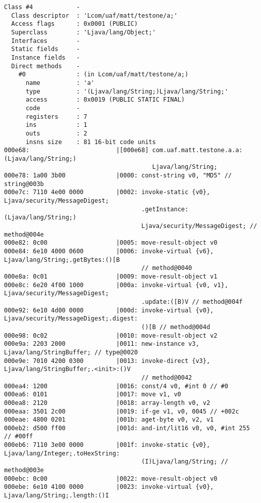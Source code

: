 \begin{lstlisting}
Class #4            -
  Class descriptor  : 'Lcom/uaf/matt/testone/a;'
  Access flags      : 0x0001 (PUBLIC)
  Superclass        : 'Ljava/lang/Object;'
  Interfaces        -
  Static fields     -
  Instance fields   -
  Direct methods    -
    #0              : (in Lcom/uaf/matt/testone/a;)
      name          : 'a'
      type          : '(Ljava/lang/String;)Ljava/lang/String;'
      access        : 0x0019 (PUBLIC STATIC FINAL)
      code          -
      registers     : 7
      ins           : 1
      outs          : 2
      insns size    : 81 16-bit code units
000e68:                        |[000e68] com.uaf.matt.testone.a.a:(Ljava/lang/String;)
                                         Ljava/lang/String;
000e78: 1a00 3b00              |0000: const-string v0, "MD5" // string@003b
000e7c: 7110 4e00 0000         |0002: invoke-static {v0}, Ljava/security/MessageDigest;
                                      .getInstance:(Ljava/lang/String;)
                                      Ljava/security/MessageDigest; // method@004e
000e82: 0c00                   |0005: move-result-object v0
000e84: 6e10 4000 0600         |0006: invoke-virtual {v6}, Ljava/lang/String;.getBytes:()[B
                                      // method@0040
000e8a: 0c01                   |0009: move-result-object v1
000e8c: 6e20 4f00 1000         |000a: invoke-virtual {v0, v1}, Ljava/security/MessageDigest;
                                      .update:([B)V // method@004f
000e92: 6e10 4d00 0000         |000d: invoke-virtual {v0}, Ljava/security/MessageDigest;.digest:
                                      ()[B // method@004d
000e98: 0c02                   |0010: move-result-object v2
000e9a: 2203 2000              |0011: new-instance v3, Ljava/lang/StringBuffer; // type@0020
000e9e: 7010 4200 0300         |0013: invoke-direct {v3}, Ljava/lang/StringBuffer;.<init>:()V
                                      // method@0042
000ea4: 1200                   |0016: const/4 v0, #int 0 // #0
000ea6: 0101                   |0017: move v1, v0
000ea8: 2120                   |0018: array-length v0, v2
000eaa: 3501 2c00              |0019: if-ge v1, v0, 0045 // +002c
000eae: 4800 0201              |001b: aget-byte v0, v2, v1
000eb2: d500 ff00              |001d: and-int/lit16 v0, v0, #int 255 // #00ff
000eb6: 7110 3e00 0000         |001f: invoke-static {v0}, Ljava/lang/Integer;.toHexString:
                                      (I)Ljava/lang/String; // method@003e
000ebc: 0c00                   |0022: move-result-object v0
000ebe: 6e10 4100 0000         |0023: invoke-virtual {v0}, Ljava/lang/String;.length:()I

\end{lstlisting}

